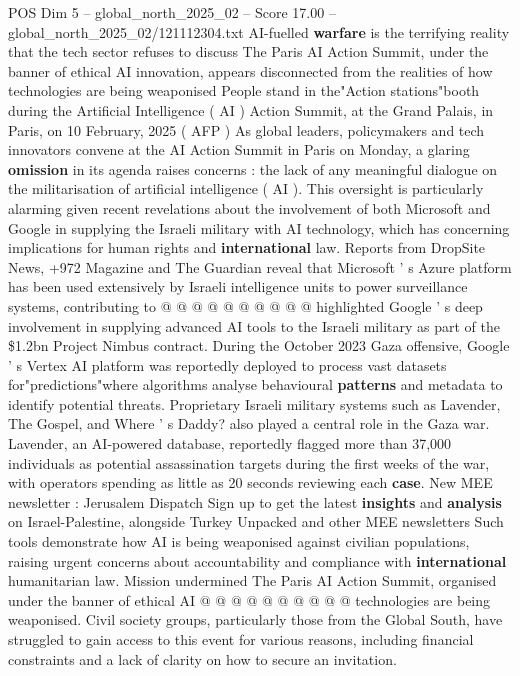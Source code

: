 \begin{textsample}{POS Dim 5 – global\_north\_2025\_02 – Score 17.00 – global\_north\_2025\_02/121112304.txt}  \label{ex:f5_pos_209}
AI-fuelled \textbf{warfare} is the terrifying reality that the tech sector refuses to discuss The Paris AI Action Summit, under the banner of ethical AI innovation, appears disconnected from the realities of how technologies are being weaponised People stand in the"Action stations"booth during the Artificial Intelligence ( AI ) Action Summit, at the Grand Palais, in Paris, on 10 February, 2025 ( AFP ) As global leaders, policymakers and tech innovators convene at the AI Action Summit in Paris on Monday, a glaring \textbf{omission} in its agenda raises concerns : the lack of any meaningful dialogue on the militarisation of artificial intelligence ( AI ).
This oversight is particularly alarming given recent revelations about the involvement of both Microsoft and Google in supplying the Israeli military with AI technology, which has concerning implications for human rights and \textbf{international} law.
Reports from DropSite News, +972 Magazine and The Guardian reveal that Microsoft ' s Azure platform has been used extensively by Israeli intelligence units to power surveillance systems, contributing to @ @ @ @ @ @ @ @ @ @ highlighted Google ' s deep involvement in supplying advanced AI tools to the Israeli military as part of the \$1.2bn Project Nimbus contract.
During the October 2023 Gaza offensive, Google ' s Vertex AI platform was reportedly deployed to process vast datasets for"predictions"where algorithms analyse behavioural \textbf{patterns} and metadata to identify potential threats.
Proprietary Israeli military systems such as Lavender, The Gospel, and Where ' s Daddy? also played a central role in the Gaza war.
Lavender, an AI-powered database, reportedly flagged more than 37,000 individuals as potential assassination targets during the first weeks of the war, with operators spending as little as 20 seconds reviewing each \textbf{case}.
New MEE newsletter : Jerusalem Dispatch Sign up to get the latest \textbf{insights} and \textbf{analysis} on Israel-Palestine, alongside Turkey Unpacked and other MEE newsletters Such tools demonstrate how AI is being weaponised against civilian populations, raising urgent concerns about accountability and compliance with \textbf{international} humanitarian law.
Mission undermined The Paris AI Action Summit, organised under the banner of ethical AI @ @ @ @ @ @ @ @ @ @ technologies are being weaponised.
Civil society groups, particularly those from the Global South, have struggled to gain access to this event for various reasons, including financial constraints and a lack of clarity on how to secure an invitation.

\end{textsample}
